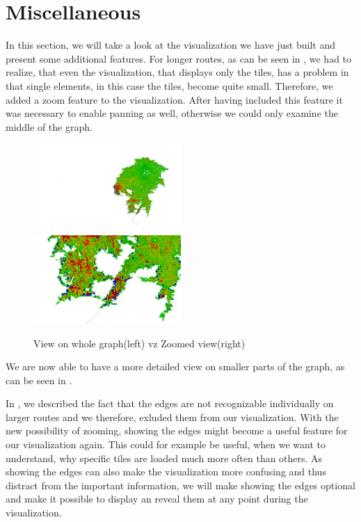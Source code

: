 \documentclass
[
    paper = a4,
    pagesize,
    12 pt,
    oneside,                       %
    open = right,
    DIV = calc,
    BCOR = 0 mm,                   %
    bibtotoc
]
{scrbook}
\begin{document}
\section{Miscellaneous}

In this section, we will take a look at the visualization we have just built and present some additional features.
For longer routes, as can be seen in , we had to realize, that even the visualization, that displays only the tiles, has a problem in that single elements, in this case the tiles, become quite small.
Therefore, we added a zoom feature to the visualization.
After having included this feature it was necessary to enable panning as well, otherwise we could only examine the middle of the graph.

\begin{figure}
    \includegraphics[width=0.5\textwidth]{Images/vis-zoom-small.png}
    \includegraphics[width=0.5\textwidth]{Images/vis-zoom-large.png}
\caption[]{View on whole graph(left) vz Zoomed view(right)}
\label{fig:zoom}
\end{figure}

We are now able to have a more detailed view on smaller parts of the graph, as can be seen in .

In , we described the fact that the edges are not recognizable individually on larger routes and we therefore, exluded them from our visualization.
With the new possibility of zooming, showing the edges might become a useful feature for our visualization again.
This could for example be useful, when we want to understand, why specific tiles are loaded much more often than others.
As showing the edges can also make the visualization more confusing and thus distract from the important information, we will make showing the edges optional and make it possible to display an reveal them at any point during the visualization.
\end{document}

